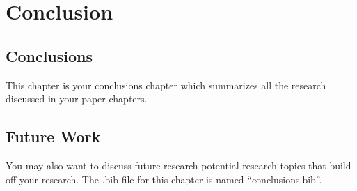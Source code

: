 \chapter{Conclusion}

\section{Conclusions}

This chapter is your conclusions chapter which summarizes all the research
discussed in your paper chapters.

\section{Future Work}

You may also want to discuss future research potential research topics that
build off your research. The .bib file for this chapter is named
``conclusions.bib''.

\singlespacing


\doublespacing
